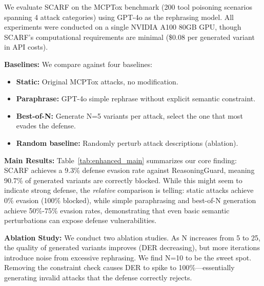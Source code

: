 We evaluate SCARF on the MCPTox benchmark (200 tool poisoning scenarios spanning 4 attack categories) using GPT-4o as the rephrasing model. 
All experiments were conducted on a single NVIDIA A100 80GB GPU, though SCARF's computational requirements are minimal (\$0.08 per generated variant in API costs).

\textbf{Baselines:} We compare against four baselines:
\begin{itemize}
    \item \textbf{Static:} Original MCPTox attacks, no modification.
    \item \textbf{Paraphrase:} GPT-4o simple rephrase without explicit semantic constraint.
    \item \textbf{Best-of-N:} Generate N=5 variants per attack, select the one that most evades the defense.
    \item \textbf{Random baseline:} Randomly perturb attack descriptions (ablation).
\end{itemize}

\textbf{Main Results:} Table~\ref{tab:enhanced_main} summarizes our core finding: SCARF achieves a 9.3\% defense evasion rate against ReasoningGuard, meaning 90.7\% of generated variants are correctly blocked.
While this might seem to indicate strong defense, the \textit{relative} comparison is telling: static attacks achieve 0\% evasion (100\% blocked), while simple paraphrasing and best-of-N generation achieve 50\%-75\% evasion rates, demonstrating that even basic semantic perturbations can expose defense vulnerabilities.

\textbf{Ablation Study:} We conduct two ablation studies. 
As N increases from 5 to 25, the quality of generated variants improves (DER decreasing), but more iterations introduce noise from excessive rephrasing. 
We find N=10 to be the sweet spot. 
Removing the constraint check causes DER to spike to 100\%---essentially generating invalid attacks that the defense correctly rejects.